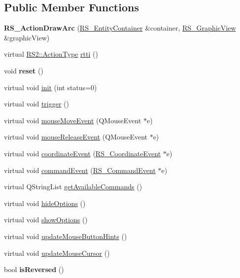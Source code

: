 \subsection*{Public Member Functions}
\begin{DoxyCompactItemize}
\item 
\hypertarget{classRS__ActionDrawArc_a6c0c133a02c76e4c5f002bd2c1f60300}{{\bfseries R\-S\-\_\-\-Action\-Draw\-Arc} (\hyperlink{classRS__EntityContainer}{R\-S\-\_\-\-Entity\-Container} \&container, \hyperlink{classRS__GraphicView}{R\-S\-\_\-\-Graphic\-View} \&graphic\-View)}\label{classRS__ActionDrawArc_a6c0c133a02c76e4c5f002bd2c1f60300}

\item 
virtual \hyperlink{classRS2_afe3523e0bc41fd637b892321cfc4b9d7}{R\-S2\-::\-Action\-Type} \hyperlink{classRS__ActionDrawArc_ac7a628f858cbab9cfab9c6b8df7e780e}{rtti} ()
\item 
\hypertarget{classRS__ActionDrawArc_adb46dd15dbb85bc0c8eab0be4286813f}{void {\bfseries reset} ()}\label{classRS__ActionDrawArc_adb46dd15dbb85bc0c8eab0be4286813f}

\item 
virtual void \hyperlink{classRS__ActionDrawArc_a65aba046c3cd4db4841d4560559f6fa3}{init} (int status=0)
\item 
virtual void \hyperlink{classRS__ActionDrawArc_ab6d03ad94c858d0dacf1eb86f95e7764}{trigger} ()
\item 
virtual void \hyperlink{classRS__ActionDrawArc_a8a201a9680c4e8494d1a9c75525967b2}{mouse\-Move\-Event} (Q\-Mouse\-Event $\ast$e)
\item 
virtual void \hyperlink{classRS__ActionDrawArc_a2322f4561cb50afec4c29dcd8dd88a62}{mouse\-Release\-Event} (Q\-Mouse\-Event $\ast$e)
\item 
virtual void \hyperlink{classRS__ActionDrawArc_a821db771fbe8a6657a9e5d1d969cb916}{coordinate\-Event} (\hyperlink{classRS__CoordinateEvent}{R\-S\-\_\-\-Coordinate\-Event} $\ast$e)
\item 
virtual void \hyperlink{classRS__ActionDrawArc_a4d4de68a4159c129524f85a689e90513}{command\-Event} (\hyperlink{classRS__CommandEvent}{R\-S\-\_\-\-Command\-Event} $\ast$e)
\item 
virtual Q\-String\-List \hyperlink{classRS__ActionDrawArc_a607c2d9caaa7cf29af5574e2d8ca299e}{get\-Available\-Commands} ()
\item 
virtual void \hyperlink{classRS__ActionDrawArc_a92c8af13459b744477458b842f8ab331}{hide\-Options} ()
\item 
virtual void \hyperlink{classRS__ActionDrawArc_ae7f5d1d5ce4faead0d9d8466041c5cd7}{show\-Options} ()
\item 
virtual void \hyperlink{classRS__ActionDrawArc_af0b9d0aeae702caa2dbbc5ae453ce3dc}{update\-Mouse\-Button\-Hints} ()
\item 
virtual void \hyperlink{classRS__ActionDrawArc_a3f2d2dff437df432ee67079aa0002432}{update\-Mouse\-Cursor} ()
\item 
\hypertarget{classRS__ActionDrawArc_a9ab5e790651cf9d7f033b342f3734f37}{bool {\bfseries is\-Reversed} ()}\label{classRS__ActionDrawArc_a9ab5e790651cf9d7f033b342f3734f37}


\end{DoxyCompactItemize}
